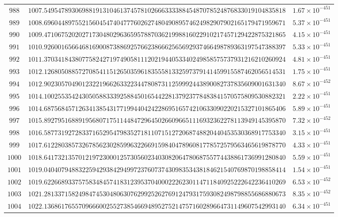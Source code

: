 \documentclass[12pt,reqno]{amsart}
\theoremstyle{remark}
\begin{document}
\begin{longtable}{clc}
$988$ & $1007.5495478930698819131046137457810266633338845487078524876833019104835818$ & $1.67\times 10^{-451}$ \\
$989$ & $1008.6960448975521560454740477760262748049089574624982907902165179471959671$ & $5.37\times 10^{-451}$ \\
$990$ & $1009.4710675202027173048029636595788703621998816022910217457129422875321865$ & $4.15\times 10^{-451}$ \\
$991$ & $1010.9260016566468169008738869257662386662565692937466498789363197547388397$ & $5.33\times 10^{-451}$ \\
$992$ & $1011.3703418438077582427197490581112021944053340249858575737931216210260924$ & $4.81\times 10^{-451}$ \\
$993$ & $1012.1268050885727085411512650359618355581332597379141459915587462056514531$ & $1.75\times 10^{-451}$ \\
$994$ & $1012.9023057049012322196626332234478087311259992443890082737835609001631340$ & $8.67\times 10^{-452}$ \\
$995$ & $1014.1002553542430505883339258845016544228137923778483841570575809530882321$ & $2.22\times 10^{-451}$ \\
$996$ & $1014.6875684571263413854317719944042422869516574210633090220215327101865406$ & $5.89\times 10^{-451}$ \\
$997$ & $1015.8927951688919568071751144847296450266096651116932362278113949145395870$ & $7.32\times 10^{-452}$ \\
$998$ & $1016.5877319272833716529547983527181107151272068748820440453530368917753340$ & $3.15\times 10^{-451}$ \\
$999$ & $1017.6122803857326785623028599632266915984047896081778572579563465619878770$ & $4.33\times 10^{-451}$ \\
$1000$ & $1018.6417321357012197230001257305602340308206478068755774438861736991280840$ & $5.59\times 10^{-451}$ \\
$1001$ & $1019.0404079488322594293842949972376073743098353438184621540769870198858414$ & $1.54\times 10^{-451}$ \\
$1002$ & $1019.6226689337575834845741831239537040002226230114711840925222642236410269$ & $6.53\times 10^{-452}$ \\
$1003$ & $1021.2813371582498474530480630762992526276912479317593082498798855686880673$ & $8.35\times 10^{-452}$ \\
$1004$ & $1022.1368617655709666002552738546694895275214757160289664731149607542993140$ & $6.34\times 10^{-451}$ \\

\end{longtable}
\end{document}
